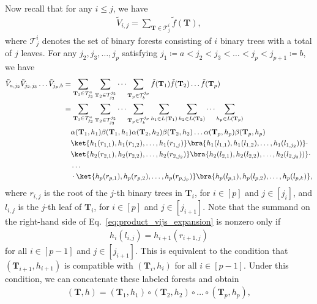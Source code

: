 \documentclass[superscriptaddress,onecolumn,nofootinbib,longbibliography,a4paper,accepted=2026-09-29]{quantumarticle}
\theoremstyle{plain}
\theoremstyle{definition}
\numberwithin{thm}{section}
\numberwithin{assumption}{section}
\numberwithin{lemma}{section}
\numberwithin{prop}{section}
\numberwithin{cor}{section}
\numberwithin{definition}{section}
\numberwithin{rmk}{section}
\numberwithin{equation}{section}
\newcommand{\defeq}{\coloneqq}
\newcommand{\mbf}{\mathbf{T}}
\begin{document}
Now recall that for any $i \le j$, we have 
\begin{align}
\tilde{V}_{i,j}=\sum_{\mbf \in \mathcal{T}^i_j} \tilde{f}(\mbf),
\end{align}
where $\mathcal{T}^i_j$ denotes the set of binary forests consisting of $i$ binary trees with a total of $j$ leaves. For any $j_2, j_3, \dots, j_p$ satisfying $j_1\defeq a<j_2<j_3<\dots<j_p<j_{p+1}\defeq b$, we have
\begin{align}
\tilde{V}_{a,j_2} \tilde{V}_{j_2, j_3} \dots \tilde{V}_{j_p, b}
&=\sum_{\mbf_1 \in \mathcal{T}^{a}_{j_2}}
\sum_{\mbf_2 \in \mathcal{T}^{j_2}_{j_3}}
\dots
\sum_{\mbf_p \in \mathcal{T}^{j_p}_b}
\tilde{f}(\mbf_1)\tilde{f}(\mbf_2)\dots \tilde{f}(\mbf_p) \\
&=\sum_{\mbf_1 \in \mathcal{T}^{a}_{j_2}}
\sum_{\mbf_2 \in \mathcal{T}^{j_2}_{j_3}}
    \dots
\sum_{\mbf_p \in \mathcal{T}^{j_p}_{b}}
\sum_{h_1 \in L(\mbf_1)}
\sum_{h_2 \in L(\mbf_2)}
\dots
\sum_{h_p \in L(\mbf_p)} \nonumber \\
&\quad \alpha(\mbf_1, h_1)
\beta(\mbf_1, h_1)
\alpha(\mbf_2, h_2)
\beta(\mbf_2, h_2)
\dots 
\alpha(\mbf_p, h_p)
\beta(\mbf_p, h_p) \nonumber \\
&\quad \ket{h_1(r_{1,1}), h_1(r_{1,2}), \dots, h_1(r_{1,j})}
\bra{h_1(l_{1,1}), h_1(l_{1,2}), \dots, h_1(l_{1, j_2}))}
\cdot \nonumber \\
&\quad \ket{h_2(r_{2,1}), h_2(r_{2,2}), \dots, h_2(r_{2, j_2})}
\bra{h_2(l_{2,1}), h_2(l_{2,2}), \dots, h_2(l_{2, j_3}))}
\cdot \nonumber \\
&\quad \dots  \nonumber \\
& \quad 
\cdot\ket{h_p(r_{p,1}), h_p(r_{p,2}), \dots, h_p(r_{p,j_p})}
\bra{h_p(l_{p,1}), h_p(l_{p,2}), \dots, h_p(l_{p,k})},
\label{eq:product_vijs_expansion}
\end{align}
where $r_{i,j}$ is the root of the $j$-th binary trees in $\mbf_i$,
for $i \in [p]$ and $j \in [j_i]$, 
and $l_{i,j}$ is the $j$-th leaf of $\mbf_i$, 
for $i \in [p]$ and $j \in [j_{i+1}]$. Note that the summand on the right-hand side of Eq.~\eqref{eq:product_vijs_expansion} is nonzero only if 
\begin{align}
h_i(l_{i,j})=h_{i+1}(r_{i+1, j})    
\end{align}
for all $i \in [p-1]$ and $j \in [j_{i+1}]$. This is equivalent to the condition that $(\mbf_{i+1}, h_{i+1})$ is compatible with $(\mbf_i, h_i)$ for all $i \in [p-1]$. Under this condition, we can concatenate these labeled forests and obtain 
\begin{align}
(\mbf, h) = (\mbf_1, h_1) \circ (\mbf_2, h_2) \circ \dots \circ (\mbf_p, h_p),    
\end{align}
\end{document}
